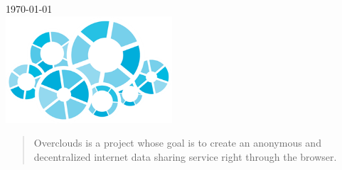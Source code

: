 \begin{titlepage}
{\large \today} \\[0.8cm] %

\includegraphics[height=4cm]{overclouds.png}\\[0.5cm]
 
\begin{abstract}
Overclouds is a project whose goal is to create an anonymous and decentralized internet data sharing service right through the browser.
\end{abstract}

\end{titlepage}